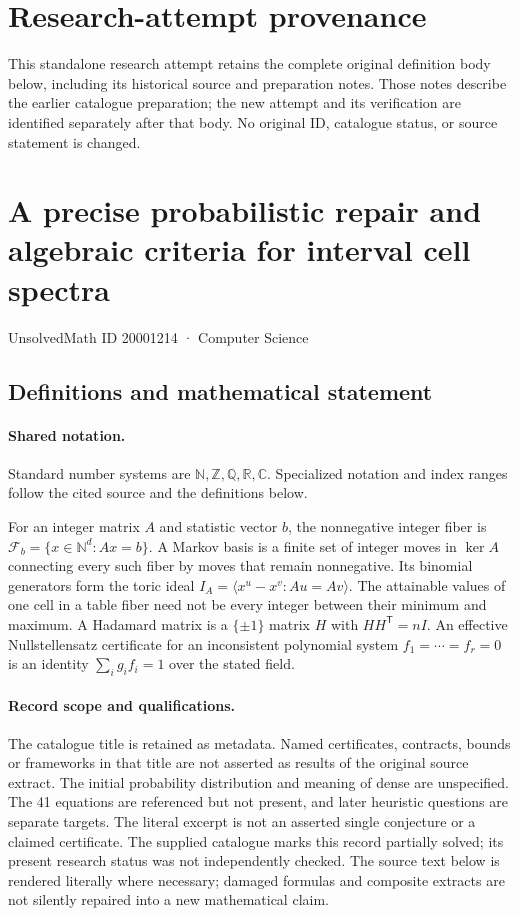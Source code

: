 \documentclass[11pt]{article}
\begin{document}
\section*{Research-attempt provenance}
This standalone research attempt retains the complete original definition body below,
including its historical source and preparation notes. Those notes describe the
earlier catalogue preparation; the new attempt and its verification are identified
separately after that body. No original ID, catalogue status, or source statement is changed.

\section{A precise probabilistic repair and algebraic criteria for interval cell spectra}\label{20001214}
{\small UnsolvedMath ID 20001214 · Computer Science}
\subsection{Definitions and mathematical statement}

\paragraph{Shared notation.}Standard number systems are $\mathbb N,\mathbb Z,\mathbb Q,\mathbb R,\mathbb C$. Specialized notation and index ranges follow the cited source and the definitions below.


For an integer matrix $A$ and statistic vector $b$, the nonnegative integer fiber is $\mathcal F_b=\{x\in\mathbb N^d:Ax=b\}$. A Markov basis is a finite set of integer moves in $\ker A$ connecting every such fiber by moves that remain nonnegative. Its binomial generators form the toric ideal $I_A=\langle x^u-x^v:Au=Av\rangle$. The attainable values of one cell in a table fiber need not be every integer between their minimum and maximum. A Hadamard matrix is a $\{\pm1\}$ matrix $H$ with $HH^{\mathsf T}=nI$. An effective Nullstellensatz certificate for an inconsistent polynomial system $f_1=\cdots=f_r=0$ is an identity $\sum_i g_if_i=1$ over the stated field.
\paragraph{Record scope and qualifications.}
The catalogue title is retained as metadata. Named certificates, contracts, bounds or frameworks in that title are not asserted as results of the original source extract.
The initial probability distribution and meaning of dense are unspecified. The 41 equations are referenced but not present, and later heuristic questions are separate targets. The literal excerpt is not an asserted single conjecture or a claimed certificate. The supplied catalogue marks this record partially solved; its present research status was not independently checked.
The source text below is rendered literally where necessary; damaged formulas and composite extracts are not silently repaired into a new mathematical claim.
\end{document}
